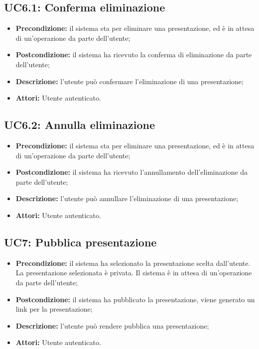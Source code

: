 \subsection{ UC6.1: Conferma eliminazione}

\begin{itemize}
	\item \textbf{Precondizione:} il sistema sta per eliminare una presentazione, ed è in attesa di un'operazione da parte dell'utente;
	\item \textbf{Postcondizione:} il sistema ha ricevuto la conferma di eliminazione da parte dell'utente;
	\item \textbf{Descrizione:} l'utente può confermare l'eliminazione di una presentazione;
	\item \textbf{Attori:} Utente autenticato.
\end{itemize}
\subsection{ UC6.2: Annulla eliminazione}

\begin{itemize}
	\item \textbf{Precondizione:} il sistema sta per eliminare una presentazione, ed è in attesa di un'operazione da parte dell'utente;
	\item \textbf{Postcondizione:} il sistema ha ricevuto l'annullamento dell'eliminazione da parte dell'utente;
	\item \textbf{Descrizione:} l'utente può annullare l'eliminazione di una presentazione;
	\item \textbf{Attori:} Utente autenticato.
\end{itemize}
\subsection{ UC7: Pubblica presentazione}

\begin{itemize}
	\item \textbf{Precondizione:} il sistema ha selezionato la presentazione scelta dall'utente. La presentazione selezionata è privata. Il sistema è in attesa di un'operazione da parte dell'utente;
	\item \textbf{Postcondizione:} il sistema ha pubblicato la presentazione, viene generato un link per la presentazione;
	\item \textbf{Descrizione:} l'utente può rendere pubblica una presentazione;
	\item \textbf{Attori:} Utente autenticato.
\end{itemize}
